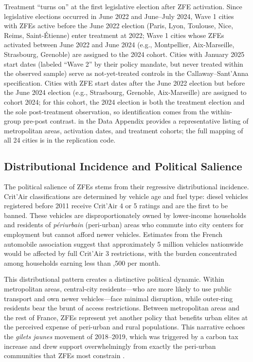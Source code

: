 \documentclass[12pt]{article}
\begin{document}
Treatment ``turns on'' at the first legislative election after ZFE activation. Since legislative elections occurred in June 2022 and June--July 2024, Wave 1 cities with ZFEs active before the June 2022 election (Paris, Lyon, Toulouse, Nice, Reims, Saint-\'Etienne) enter treatment at 2022; Wave 1 cities whose ZFEs activated between June 2022 and June 2024 (e.g., Montpellier, Aix-Marseille, Strasbourg, Grenoble) are assigned to the 2024 cohort. Cities with January 2025 start dates (labeled ``Wave 2'' by their policy mandate, but never treated within the observed sample) serve as not-yet-treated controls in the Callaway--Sant'Anna specification. Cities with ZFE start dates after the June 2022 election but before the June 2024 election (e.g., Strasbourg, Grenoble, Aix-Marseille) are assigned to cohort 2024; for this cohort, the 2024 election is both the treatment election and the sole post-treatment observation, so identification comes from the within-group pre-post contrast.  in the Data Appendix provides a representative listing of metropolitan areas, activation dates, and treatment cohorts; the full mapping of all 24 cities is in the replication code.

\subsection{Distributional Incidence and Political Salience}

The political salience of ZFEs stems from their regressive distributional incidence. Crit'Air classifications are determined by vehicle age and fuel type: diesel vehicles registered before 2011 receive Crit'Air 4 or 5 ratings and are the first to be banned. These vehicles are disproportionately owned by lower-income households and residents of \textit{p\'eriurbain} (peri-urban) areas who commute into city centers for employment but cannot afford newer vehicles. Estimates from the French automobile association suggest that approximately 5 million vehicles nationwide would be affected by full Crit'Air 3 restrictions, with the burden concentrated among households earning less than ,500 per month.

This distributional pattern creates a distinctive political dynamic. Within metropolitan areas, central-city residents---who are more likely to use public transport and own newer vehicles---face minimal disruption, while outer-ring residents bear the brunt of access restrictions. Between metropolitan areas and the rest of France, ZFEs represent yet another policy that benefits urban elites at the perceived expense of peri-urban and rural populations. This narrative echoes the \textit{gilets jaunes} movement of 2018--2019, which was triggered by a carbon tax increase and drew support overwhelmingly from exactly the peri-urban communities that ZFEs most constrain \citep{douenne2022yellow}.
\end{document}
